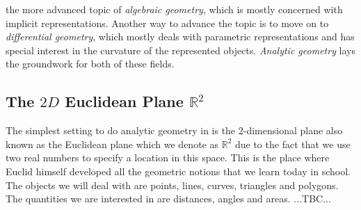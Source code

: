 the more advanced topic of \emph{algebraic geometry}, which is mostly concerned with implicit representations. Another way to advance the topic is to move on to \emph{differential geometry}, which mostly deals with parametric representations and has special interest in the curvature of the represented objects. \emph{Analytic geometry} lays the groundwork for both of these fields. 


%


\subsection{The $2D$ Euclidean Plane $\mathbb{R}^2$}
The simplest setting to do analytic geometry in is the $2$-dimensional plane also known as the Euclidean plane which we denote as $\mathbb{R}^2$ due to the fact that we use two real numbers to specify a location in this space. This is the place where Euclid himself developed all the geometric notions that we learn today in school. The objects we will deal with are points, lines, curves, triangles and polygons. The quantities we are interested in are distances, angles and areas. ...TBC...


